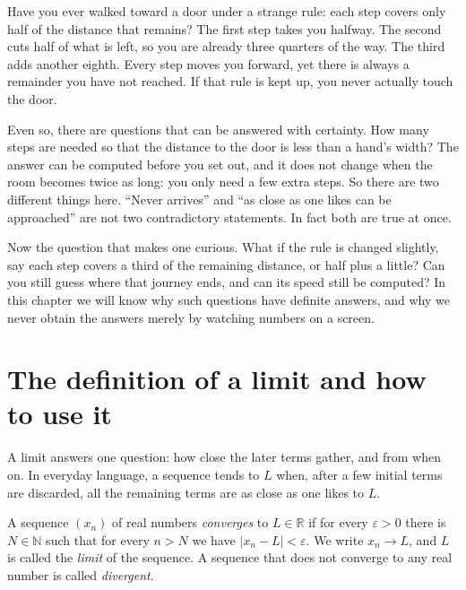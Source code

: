 \begin{untukanak}
Have you ever walked toward a door under a strange rule: each step covers only
half of the distance that remains? The first step takes you halfway. The second
cuts half of what is left, so you are already three quarters of the way. The third
adds another eighth. Every step moves you forward, yet there is always a remainder
you have not reached. If that rule is kept up, you never actually touch the door.

Even so, there are questions that can be answered with certainty. How many steps
are needed so that the distance to the door is less than a hand's width? The answer
can be computed before you set out, and it does not change when the room becomes
twice as long: you only need a few extra steps. So there are two different things
here. ``Never arrives'' and ``as close as one likes can be approached'' are not two
contradictory statements. In fact both are true at once.

Now the question that makes one curious. What if the rule is changed slightly, say
each step covers a third of the remaining distance, or half plus a little? Can you
still guess where that journey ends, and can its speed still be computed? In this
chapter we will know why such questions have definite answers, and why we never
obtain the answers merely by watching numbers on a screen.
\end{untukanak}

\section{The definition of a limit and how to use it}


A limit answers one question: how close the later terms gather, and from when on.
In everyday language, a sequence tends to $L$ when, after a few initial terms are
discarded, all the remaining terms are as close as one likes to $L$.

\begin{definisi}[Convergence]
A sequence $(x_n)$ of real numbers \emph{converges} to $L \in \mathbb{R}$ if for
every $\varepsilon>0$ there is $N \in \mathbb{N}$ such that for every $n>N$ we have
$|x_n-L|<\varepsilon$. We write $x_n \to L$, and $L$ is called the
\emph{limit} of the sequence. A sequence that does not
converge to any real number is called \emph{divergent}.
\end{definisi}


